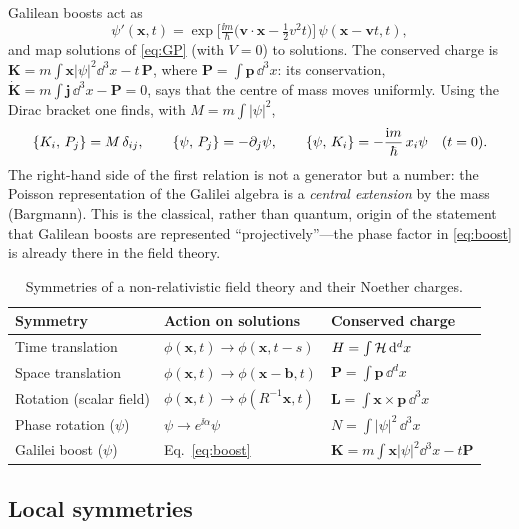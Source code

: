 Galilean boosts act as
\begin{equation}
  \psi'(\mathbf{x},t)=\exp\!\Big[\tfrac{\ii m}{\hbar}\big(\mathbf{v}\!\cdot\!\mathbf{x}-\tfrac12v^2t\big)\Big]\,
  \psi(\mathbf{x}-\mathbf{v}t,t),
  \label{eq:boost}
\end{equation}
and map solutions of \eqref{eq:GP} (with $V=0$) to solutions. The conserved charge is
$\mathbf{K}=m\!\int\!\mathbf{x}|\psi|^2\dd^3x-t\,\mathbf{P}$, where
$\mathbf{P}=\int\mathbf{p}\,\dd^3x$: its conservation, $\dot{\mathbf{K}}=m\!\int\!\mathbf{j}\,\dd^3x-\mathbf{P}=0$,
says that the centre of mass moves uniformly. Using the Dirac bracket one finds, with
$M=m\!\int\!|\psi|^2$,
\begin{equation}
  \{K_i,\,P_j\}=M\,\delta_{ij},\qquad \{\psi,\,P_j\}=-\partial_j\psi,
  \qquad \{\psi,\,K_i\}=-\frac{\mathrm{i} m}{\hbar}\,x_i\psi \quad(t=0).
\end{equation}
The right-hand side of the first relation is not a generator but a number: the
Poisson representation of the Galilei algebra is a \emph{central extension} by the
mass (Bargmann). This is the classical, rather than quantum, origin of the
statement that Galilean boosts are represented ``projectively''---the phase factor
in \eqref{eq:boost} is already there in the field theory.

\begin{table}[t]
\centering
\small
\begin{tabular}{@{}lll@{}}
\toprule
Symmetry & Action on solutions & Conserved charge\\
\midrule
Time translation & $\phi(\mathbf{x},t)\to\phi(\mathbf{x},t-s)$ & $H=\int\mathcal{H}\,\mathrm{d}^dx$\\
Space translation & $\phi(\mathbf{x},t)\to\phi(\mathbf{x}-\mathbf{b},t)$ & $\mathbf{P}=\int\mathbf{p}\,\dd^dx$\\
Rotation (scalar field) & $\phi(\mathbf{x},t)\to\phi(R^{-1}\mathbf{x},t)$ & $\mathbf{L}=\int\mathbf{x}\times\mathbf{p}\,\dd^3x$\\
Phase rotation ($\psi$) & $\psi\to e^{\ii\alpha}\psi$ & $N=\int|\psi|^2\,\dd^3x$\\
Galilei boost ($\psi$) & Eq.~\eqref{eq:boost} & $\mathbf{K}=m\int\mathbf{x}|\psi|^2\dd^3x-t\mathbf{P}$\\
\bottomrule
\end{tabular}
\caption{Symmetries of a non-relativistic field theory and their Noether charges.}
\label{tab:noether}
\end{table}

\subsection{Local symmetries}

